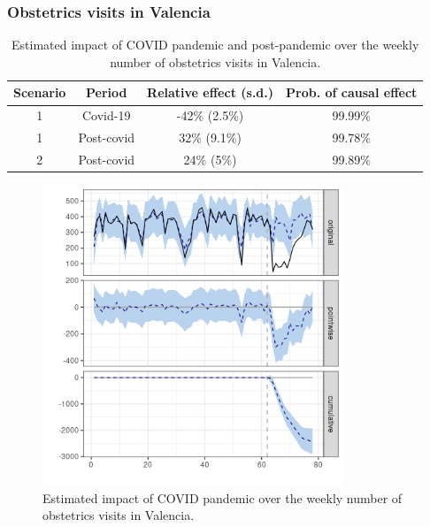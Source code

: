 \documentclass[9pt]{osa-supplemental-document}
\begin{document}
\subsubsection{Obstetrics visits in Valencia}\label{valencia}
\begin{table}[H]\caption{Estimated impact of COVID pandemic and post-pandemic over the weekly number of obstetrics visits in Valencia.}
\centering
  \begin{tabular}{ |c|c|c|c| }
      \hline
   \textbf{Scenario} & \textbf{Period} & \textbf{Relative effect (s.d.)} & \textbf{Prob. of causal effect} \\ 
   \hline
   1 & Covid-19 & -42\% (2.5\%) & 99.99\% \\  
   1 & Post-covid & 32\% (9.1\%) & 99.78\% \\
   \hline   
   2 & Post-covid & 24\% (5\%) & 99.89\% \\
   \hline
  \end{tabular}
\end{table}

\begin{center}
  \begin{figure}[H]
    \includegraphics[width=9cm]{obstetrics_covid_Valencia.png}\caption{Estimated impact of COVID pandemic over the weekly number of obstetrics visits in Valencia.}
  \end{figure}
  \end{center}
  
\end{document}
